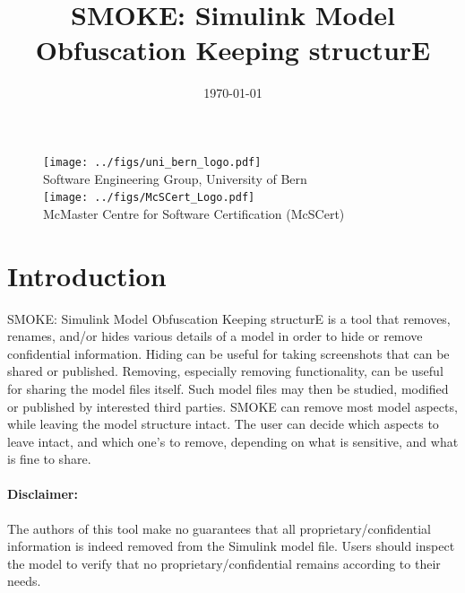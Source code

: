 \documentclass{article}
\makeatletter
\newcommand{\ToolName}{SMOKE: Simulink Model Obfuscation Keeping structurE\@\xspace}
\newcommand{\toolname}{SMOKE\@\xspace}
\makeatother
\begin{document}
\title{\ToolName}
\date{\monthyeardate\today}
\maketitle
\vfill

\begin{figure}
	\centering
	\texttt{[image: ../figs/uni\_bern\_logo.pdf]}\\ 
	Software Engineering Group, University of Bern\\
	\texttt{[image: ../figs/McSCert\_Logo.pdf]} \\
	McMaster Centre for Software Certification (McSCert)
\end{figure}

\newpage


\tableofcontents
\newpage

\section{Introduction}

\ToolName is a tool that removes, renames, and/or hides various details of a \Simulink model in order to hide or remove confidential information.
Hiding can be useful for taking screenshots that can be shared or published. Removing, especially removing functionality, can be useful
for sharing the model files itself. Such model files may then be studied, modified or published by interested third parties.
 \toolname can remove most model aspects, while leaving the model structure intact. The user 
can decide which aspects to leave intact, and which one's to remove, depending on what is sensitive, and what is fine to share.

\paragraph{Disclaimer:} The authors of this tool make no guarantees that all proprietary/confidential information is indeed removed from the Simulink model file. Users should inspect the model to verify that no proprietary/confidential remains according to their needs.
\end{document}
